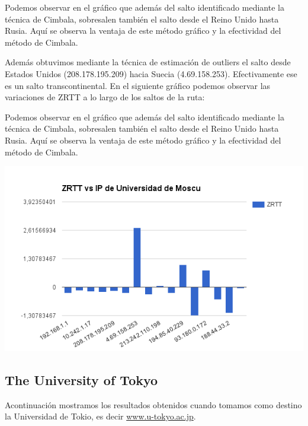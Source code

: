 Podemos observar en el gráfico que además del salto identificado mediante la técnica de Cimbala, sobresalen también el salto desde el Reino Unido hasta Rusia. Aquí se observa la ventaja de este método gráfico y la efectividad del método de Cimbala. 

Además obtuvimos mediante la técnica de estimación de outliers el salto desde Estados Unidos (208.178.195.209) hacia Suecia (4.69.158.253). Efectivamente ese es un salto transcontinental.
En el siguiente gráfico podemos observar las variaciones de ZRTT a lo largo de los saltos de la ruta:

Podemos observar en el gráfico que además del salto identificado mediante la técnica de Cimbala, sobresalen también el salto desde el Reino Unido hasta Rusia. Aquí se observa la ventaja de este método gráfico y la efectividad del método de Cimbala.


\begin{center}
\includegraphics[width=\textwidth]{imgs/moscu.png}
\end{center}


\subsection{The University of Tokyo}
Acontinuación mostramos los resultados obtenidos cuando tomamos como destino la
Universidad de Tokio, es decir \url{www.u-tokyo.ac.jp}.

